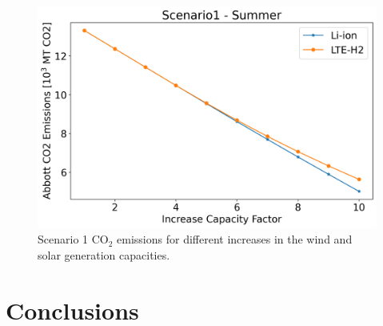 \documentclass{anstrans}
\begin{document}






\begin{figure}[htbp!] %
    \centering
    \includegraphics[width=0.90\linewidth]{figures/scenario1-summerA}
    \hfill
    \caption{Scenario 1 CO$_2$ emissions for different increases in the wind and solar generation capacities.}
    \label{fig:emissions-1-summer}
\end{figure}




\section{Conclusions}





\end{document}
